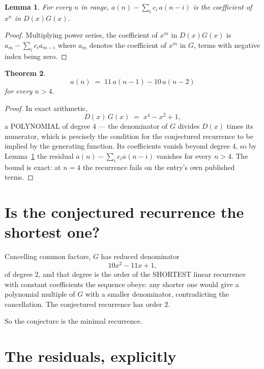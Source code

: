 \documentclass[11pt,a4paper]{article}
\theoremstyle{plain}
\newtheorem{theorem}{Theorem}
\newtheorem{lemma}[theorem]{Lemma}
\theoremstyle{definition}
\begin{document}
\begin{lemma}\label{lem:key}
For every $n$ in range, $a(n)-\sum_i c_i\,a(n-i)$ is the coefficient of $x^{n}$ in
$D(x)G(x)$.
\end{lemma}

\begin{proof}
Multiplying power series, the coefficient of $x^{m}$ in $D(x)G(x)$ is
$a_m-\sum_i c_i a_{m-i}$ where $a_m$ denotes the coefficient of $x^{m}$ in $G$, terms with
negative index being zero.
\end{proof}

\begin{theorem}
\[
a(n)\;=\;11\,a(n-1) - 10\,a(n-2)
\]
for every $n>4$.
\end{theorem}

\begin{proof}
In exact arithmetic,
\[
D(x)\,G(x)\;=\;x^{4} - x^{2} + 1,
\]
a POLYNOMIAL of degree $4$ --- the denominator of $G$ divides $D(x)$ times its numerator,
which is precisely the condition for the conjectured recurrence to be implied by the
generating function. Its coefficients vanish beyond degree $4$, so by
Lemma~\ref{lem:key} the residual $a(n)-\sum_ic_ia(n-i)$ vanishes for every
$n>4$. The bound is exact: at $n=4$ the recurrence fails on the entry's own published terms.
\end{proof}

\section{Is the conjectured recurrence the shortest one?}

Cancelling common factors, $G$ has reduced denominator
\[
10 x^{2} - 11 x + 1,
\]
of degree $2$, and that degree is the order of the SHORTEST linear recurrence with
constant coefficients the sequence obeys: any shorter one would give a polynomial multiple of
$G$ with a smaller denominator, contradicting the cancellation. The conjectured recurrence has
order $2$.

So the conjecture is the minimal recurrence.

\section{The residuals, explicitly}
\end{document}
